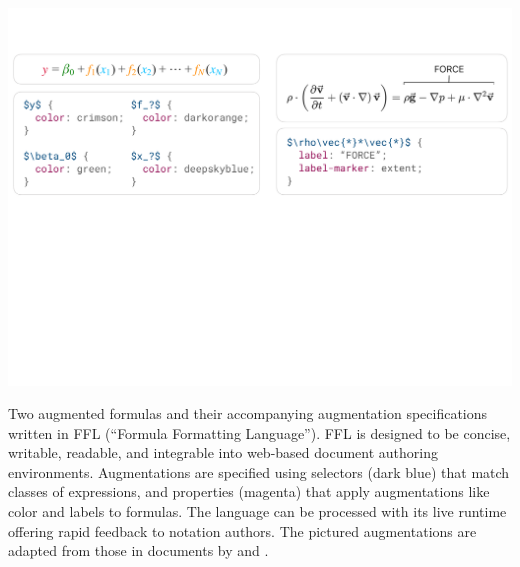 \documentclass[anonymous,sigconf,review]{acmart}
\begin{document}


\begin{teaserfigure}
  \vspace{-1ex}
  \includegraphics[width=\textwidth]{figures/teaser}
  \vspace{-5ex}
  \caption{Two augmented formulas and their accompanying augmentation specifications written in FFL (``Formula Formatting Language''). \normalfont FFL is designed to be concise, writable, readable, and integrable into web-based document authoring environments. Augmentations are specified using selectors (\textcolor{teasercyan}{dark blue}) that match classes of expressions, and properties (\textcolor{teasermagenta}{magenta}) that apply augmentations like color and labels to formulas. The language can be processed with its live runtime offering rapid feedback to notation authors. The pictured augmentations are adapted from those in documents by \citet{ref:hohman2019gamut} and \citet{ref:murad2020navierstokes}.}
  \vspace{2ex}
  \label{fig:teaser}
\end{teaserfigure}
\end{document}
